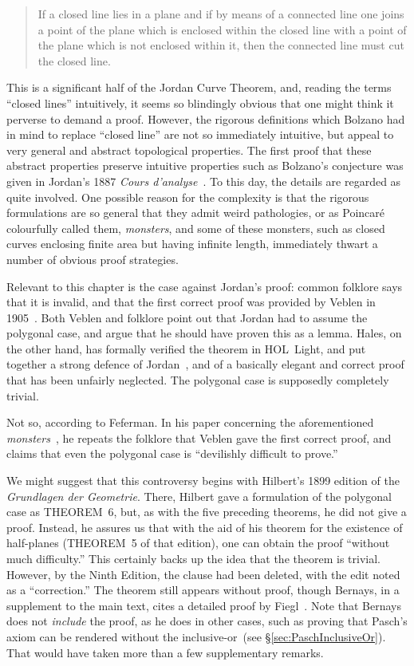 \begin{quote}
If a closed line lies in a plane and if by means of a connected line one joins a point of the plane which is enclosed within the closed line with a point of the plane which is not enclosed within it, then the connected line must cut the closed line.
\end{quote}

This is a significant half of the Jordan Curve Theorem, and, reading the terms ``closed lines'' intuitively, it seems so blindingly obvious that one might think it perverse to demand a proof. However, the rigorous definitions which Bolzano had in mind to replace ``closed line'' are not so immediately intuitive, but appeal to very general and abstract topological properties. The first proof that these abstract properties preserve intuitive properties such as Bolzano's conjecture was given in Jordan's 1887 \emph{Cours d'analyse}~\cite{JordanTextBook}. To this day, the details are regarded as quite involved. One possible reason for the complexity is that the rigorous formulations are so general that they admit weird pathologies, or as Poincar\'{e} colourfully called them, \emph{monsters}, and some of these monsters, such as closed curves enclosing finite area but having infinite length, immediately thwart a number of obvious proof strategies.

Relevant to this chapter is the case against Jordan's proof: common folklore says that it is invalid, and that the first correct proof was provided by Veblen in 1905~\cite{VeblenJordan}. Both Veblen and folklore point out that Jordan had to assume the polygonal case, and argue that he should have proven this as a lemma. Hales, on the other hand, has formally verified the theorem in HOL~Light, and put together a strong defence of Jordan~\cite{HalesJordansProof}, and of a basically elegant and correct proof that has been unfairly neglected. The polygonal case is supposedly completely trivial. 

Not so, according to Feferman. In his paper concerning the aforementioned \emph{monsters}~\cite{FefermanDevilishJCT}, he repeats the folklore that Veblen gave the first correct proof, and claims that even the polygonal case is ``devilishly difficult to prove.''

We might suggest that this controversy begins with Hilbert's 1899 edition of the \emph{Grundlagen der Geometrie}. There, Hilbert gave a formulation of the polygonal case as THEOREM~6, but, as with the five preceding theorems, he did not give a proof. Instead, he assures us that with the aid of his theorem for the existence of half-planes (THEOREM~5 of that edition), one can obtain the proof ``without much difficulty.'' This certainly backs up the idea that the theorem is trivial. However, by the Ninth Edition, the clause had been deleted, with the edit noted as a ``correction.'' The theorem still appears without proof, though Bernays, in a supplement to the main text, cites a detailed proof by Fiegl~\cite{FeiglJordan}. Note that Bernays does not \emph{include} the proof, as he does in other cases, such as proving that Pasch's axiom can be rendered without the inclusive-or~(see \S\ref{sec:PaschInclusiveOr}). That would have taken more than a few supplementary remarks.


